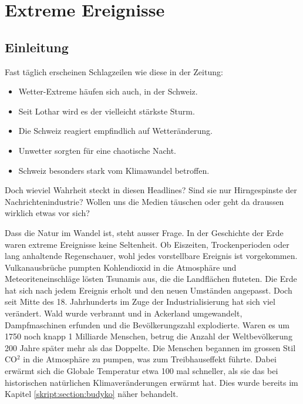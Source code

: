 %
%
%
\chapter{Extreme Ereignisse\label{chapter:thema}}
\begin{refsection}

\section{Einleitung}
Fast täglich erscheinen Schlagzeilen wie diese in der Zeitung:

\begin{itemize}
\item Wetter-Extreme häufen sich auch, in der Schweiz.
\item Seit Lothar wird es der vielleicht stärkste Sturm.
\item Die Schweiz reagiert empfindlich auf Wetteränderung.
\item Unwetter sorgten für eine chaotische Nacht.
\item Schweiz besonders stark vom Klimawandel betroffen.
\end{itemize}

Doch wieviel Wahrheit steckt in diesen Headlines? Sind sie nur Hirngespinste der Nachrichtenindustrie? Wollen uns die Medien täuschen oder geht da draussen wirklich etwas vor sich?

Dass die Natur im Wandel ist, steht ausser Frage. In der Geschichte der Erde waren extreme Ereignisse keine Seltenheit. Ob Eiszeiten, Trockenperioden oder lang anhaltende Regenschauer, wohl jedes vorstellbare Ereignis ist vorgekommen. Vulkanausbrüche pumpten Kohlendioxid in die Atmosphäre und Meteoriteneinschläge lösten Tsunamis aus, die die Landflächen fluteten. Die Erde hat sich nach jedem Ereignis erholt und den neuen Umständen angepasst. Doch seit Mitte des 18. Jahrhunderts im Zuge der Industrialisierung hat sich viel verändert. Wald wurde verbrannt und in Ackerland umgewandelt, Dampfmaschinen erfunden und die Bevölkerungszahl explodierte. Waren es um 1750 noch knapp 1 Milliarde Menschen, betrug die Anzahl der Weltbevölkerung 200 Jahre später mehr als das Doppelte. Die Menschen begannen im grossen Stil CO$^2$ in die Atmosphäre zu pumpen, was zum Treibhauseffekt führte. Dabei erwärmt sich die Globale Temperatur etwa 100 mal schneller, als sie das bei historischen natürlichen Klimaveränderungen erwärmt hat. Dies wurde bereits im Kapitel \ref{skript:section:budyko} näher behandelt. 


\end{refsection}
